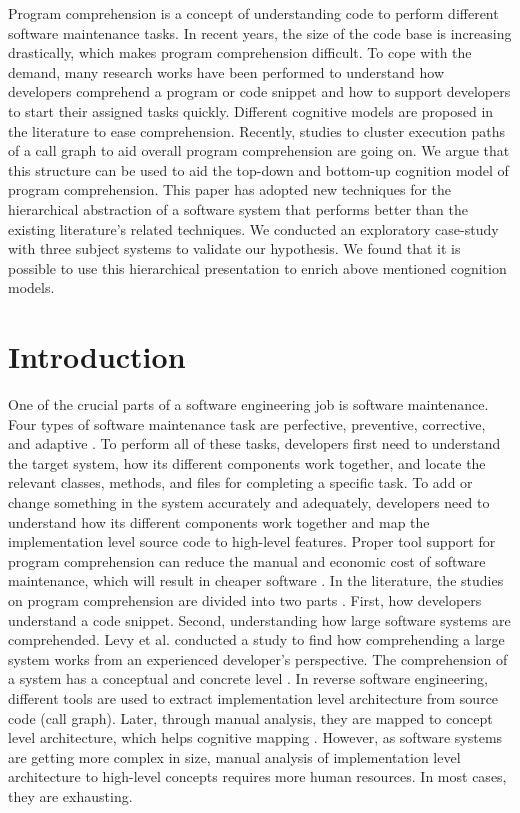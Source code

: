 \label{chapter:hla2}
Program comprehension is a concept of understanding code to perform different software maintenance tasks. In recent years, the size of the code base is increasing drastically, which makes program comprehension difficult. To cope with the demand, many research works have been performed to understand how developers comprehend a program or code snippet and how to support developers to start their assigned tasks quickly. Different cognitive models are proposed in the literature to ease comprehension. 
Recently, studies to cluster execution paths of a call graph to aid overall program comprehension are going on.
We argue that this structure can be used to aid the top-down and bottom-up cognition model of program comprehension.
This paper has adopted new techniques for the hierarchical abstraction of a software system that performs better than the existing literature's related techniques. We conducted an exploratory case-study with three subject systems to validate our hypothesis. We found that it is possible to use this hierarchical presentation to enrich above mentioned cognition models.   

\section{Introduction}

One of the crucial parts of a software engineering job is software maintenance. Four types of software maintenance task are perfective, preventive, corrective, and adaptive \cite{williams2010characterizingArchitectureChanges}. To perform all of these tasks, developers first need to understand the target system, how its different components work together, and locate the relevant classes, methods, and files for completing a specific task. To add or change something in the system accurately and adequately, developers need to understand how its different components work together and map the implementation level source code to high-level features. Proper tool support for program comprehension can reduce the manual and economic cost of software maintenance, which will result in cheaper software \cite{arisholm2006impactUMLDocumentation}. In the literature, the studies on program comprehension are divided into two parts \cite{levy2019understandingLargeHierarchical}. First, how developers understand a code snippet. Second, understanding how large software systems are comprehended. Levy et al. \cite{levy2019understandingLargeHierarchical} conducted a study to find how comprehending a large system works from an experienced developer's perspective. The comprehension of a system has a conceptual and concrete level \cite{bass2003softwareArchitecturePractice, levy2019understandingLargeHierarchical}. In reverse software engineering, different tools are used to extract implementation level architecture from source code (call graph). Later, through manual analysis, they are mapped to concept level architecture, which helps cognitive mapping \cite{roy2008softwareArchitectureRecovery}. However, as software systems are getting more complex in size, manual analysis of implementation level architecture to high-level concepts requires more human resources. In most cases, they are exhausting. 

